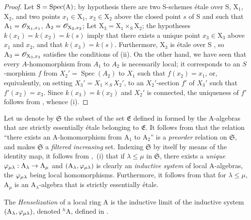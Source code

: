 \begin{proof}
Let $\mathrm{S}=\operatorname{Spec}(\mathrm{A})$;
by hypothesis there are two S-schemes \'{e}tale over S, $\mathrm{X}_1$, $\mathrm{X}_2$, and two points $x_1\in\mathrm{X}_1$, $x_2\in\mathrm{X}_2$ above the closed point $s$ of S and such that $\mathrm{A}_1=\mathscr{O}_{\mathrm{X}_1,x_1}$, $\mathrm{A}_2=\mathscr{O}_{\mathrm{X}_2,x_2}$;
Let $\mathrm{X}_3=\mathrm{X}_1\times_{\mathrm{S}}\mathrm{X}_2$;
the hypotheses $k(x_1)=k(x_2)=k(s)$  imply that there exists a unique point $x_3\in\mathrm{X}_3$ above $x_1$ and $x_2$, and that $k(x_3)=k(s)$.
Furthermore, $\mathrm{X}_3$ is \'{e}tale over S , so $\mathrm{A}_3=\mathscr{O}_{\mathrm{X}_3,x_3}$ satisfies the conditions of (ii).
On the other hand, we have seen that every $A$-homomorphism from $A_1$ to $A_2$ is necessarily local;
it corresponds to an $S$-morphism $f$ from $X_2'=\operatorname{Spec}(A_2)$ to $X_1$ such that $f(x_2)=x_1$, or, equivalently, on setting $X_3'=X_1\times_S X_2'$, to an $X_2'$-section $f'$ of $X_3'$ such that $f'(x_2)=x_3$.
Since $k(x_3)=k(x_2)$ and $X_2'$ is connected, the uniqueness of $f'$ follows from , whence (i).
\end{proof}

\begin{env}[18.6.4]
\label{IV.18.6.4}
Let us denote by $\mathfrak{S}$ the subset of the set $\mathfrak{E}$ defined in  formed by the A-algebras that are strictly essentially \'{e}tale belonging to $\mathfrak{E}$.
It follows from  that the relation ``there exists an A-homomorphism from $\mathrm{A}_1$ to $\mathrm{A}_2$'' is a \emph{preorder} relation on $\mathfrak{S}$, and makes $\mathfrak{S}$ a \emph{filtered increasing} set.
Indexing $\mathfrak{S}$ by itself by means of the identity map, it follows from ,~(i) that if $\lambda\leq\mu$ in $\mathfrak{S}$, there exists a \emph{unique} $\varphi_{\mu\lambda}:\mathrm{A}_\lambda\to\mathrm{A}_\mu$ and $(\mathrm{A}_\lambda,\varphi_{\mu\lambda})$ is clearly an \emph{inductive system} of local A-algebras, the $\varphi_{\mu\lambda}$ being local homomorphisms.
Furthermore, it follows from  that for $\lambda\leq\mu$, $\mathrm{A}_\mu$ is an $\mathrm{A}_\lambda$-algebra that is strictly essentially \'{e}tale.
\end{env}

\begin{definition}[18.6.5]
\label{IV.18.6.5}
The \emph{Henselization} of a local ring $\mathrm{A}$ is the inductive limit of the inductive system $(\mathrm{A}_\lambda,\varphi_{\mu\lambda})$, denoted ${}^h\!\mathrm{A}$, defined in .
\end{definition}

